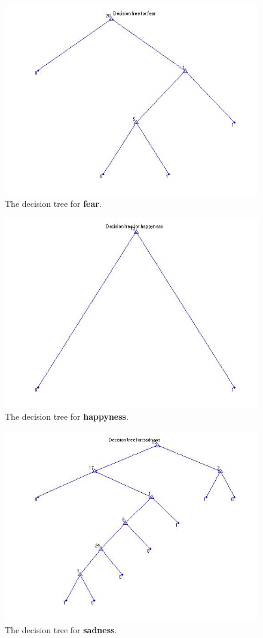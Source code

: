 \documentclass[a4paper,10pt]{article}
\begin{document}
\begin{figure}[h!]
	\centering
    \includegraphics[width=12cm]{fear}
  \caption{The decision tree for \textbf{fear}.}  
\end{figure}

\begin{figure}[h!]
	\centering
    \includegraphics[width=12cm]{happyness}
  \caption{The decision tree for \textbf{happyness}.}  
\end{figure}

\begin{figure}[h!]
	\centering
    \includegraphics[width=12cm]{sadness}
  \caption{The decision tree for \textbf{sadness}.}  
\end{figure}
\end{document}
